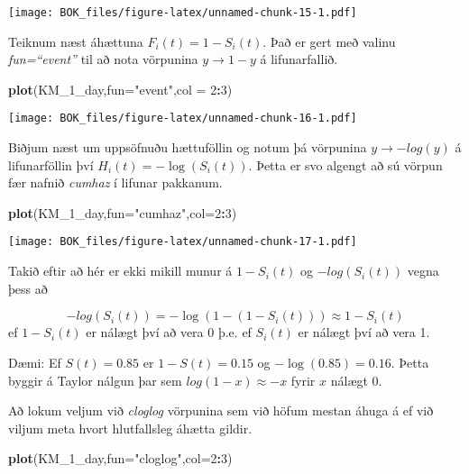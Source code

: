\documentclass[
]{book}
\newenvironment{Shaded}{\begin{snugshade}}{\end{snugshade}}
\newcommand{\DataTypeTok}[1]{\textcolor[rgb]{0.13,0.29,0.53}{#1}}
\newcommand{\DecValTok}[1]{\textcolor[rgb]{0.00,0.00,0.81}{#1}}
\newcommand{\KeywordTok}[1]{\textcolor[rgb]{0.13,0.29,0.53}{\textbf{#1}}}
\newcommand{\NormalTok}[1]{#1}
\newcommand{\OperatorTok}[1]{\textcolor[rgb]{0.81,0.36,0.00}{\textbf{#1}}}
\newcommand{\StringTok}[1]{\textcolor[rgb]{0.31,0.60,0.02}{#1}}
\begin{document}
\texttt{[image: BOK\_files/figure-latex/unnamed-chunk-15-1.pdf]}

Teiknum næst áhættuna \(F_i(t)=1-S_i(t)\). Það er gert með valinu \emph{fun=``event''} til að nota vörpunina \(y \to 1-y\) á lifunarfallið.

\begin{Shaded}
\begin{Highlighting}[]
\KeywordTok{plot}\NormalTok{(KM_}\DecValTok{1}\NormalTok{_day,}\DataTypeTok{fun=}\StringTok{"event"}\NormalTok{,}\DataTypeTok{col =} \DecValTok{2}\OperatorTok{:}\DecValTok{3}\NormalTok{)}
\end{Highlighting}
\end{Shaded}

\texttt{[image: BOK\_files/figure-latex/unnamed-chunk-16-1.pdf]}

Biðjum næst um uppsöfnuðu hættuföllin og notum þá vörpunina \(y \to -log(y)\) á lifunarföllin því \(H_i(t) = -\log(S_i(t))\). Þetta er svo algengt að sú vörpun fær nafnið \emph{cumhaz} í lifunar pakkanum.

\begin{Shaded}
\begin{Highlighting}[]
\KeywordTok{plot}\NormalTok{(KM_}\DecValTok{1}\NormalTok{_day,}\DataTypeTok{fun=}\StringTok{"cumhaz"}\NormalTok{,}\DataTypeTok{col=}\DecValTok{2}\OperatorTok{:}\DecValTok{3}\NormalTok{)}
\end{Highlighting}
\end{Shaded}

\texttt{[image: BOK\_files/figure-latex/unnamed-chunk-17-1.pdf]}

Takið eftir að hér er ekki mikill munur á \(1-S_i(t)\) og \(-log(S_i(t))\) vegna þess að

\[
-log(S_i(t))=-\log(1-(1-S_i(t))) \approx 1-S_i(t)
\]
ef \(1-S_i(t)\) er nálægt því að vera 0 þ.e. ef \(S_i(t)\) er nálægt því að vera 1.

Dæmi: Ef \(S(t)=0.85\) er \(1-S(t)=0.15\) og \(-\log(0.85)=0.16\). Þetta byggir á Taylor nálgun þar sem \(log(1-x) \approx -x\) fyrir \(x\) nálægt 0.

Að lokum veljum við \emph{cloglog} vörpunina sem við höfum mestan áhuga á ef við viljum meta hvort hlutfallsleg áhætta gildir.

\begin{Shaded}
\begin{Highlighting}[]
\KeywordTok{plot}\NormalTok{(KM_}\DecValTok{1}\NormalTok{_day,}\DataTypeTok{fun=}\StringTok{"cloglog"}\NormalTok{,}\DataTypeTok{col=}\DecValTok{2}\OperatorTok{:}\DecValTok{3}\NormalTok{)}
\end{Highlighting}
\end{Shaded}
\end{document}
